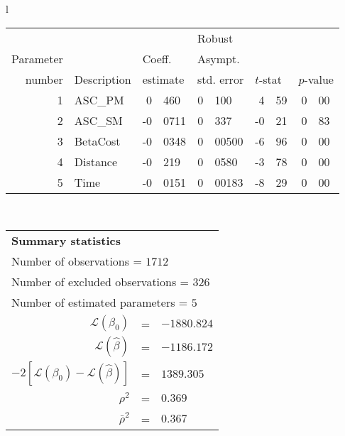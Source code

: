   \begin{tabular}{l}
\begin{tabular}{rlr@{.}lr@{.}lr@{.}lr@{.}l}
         &                       &   \multicolumn{2}{l}{}    & \multicolumn{2}{l}{Robust}  &     \multicolumn{4}{l}{}   \\
Parameter &                       &   \multicolumn{2}{l}{Coeff.}      & \multicolumn{2}{l}{Asympt.}  &     \multicolumn{4}{l}{}   \\
number &  Description                     &   \multicolumn{2}{l}{estimate}      & \multicolumn{2}{l}{std. error}  &   \multicolumn{2}{l}{$t$-stat}  &   \multicolumn{2}{l}{$p$-value}   \\

\hline

1 & ASC_PM  & 0&460 & 0&100 & 4&59 & 0&00\\
2 & ASC_SM & -0&0711 & 0&337 & -0&21 & 0&83\\
3 & BetaCost & -0&0348 & 0&00500 & -6&96 & 0&00\\
4 & Distance & -0&219 & 0&0580 & -3&78 & 0&00\\
5 & Time & -0&0151 & 0&00183 & -8&29 & 0&00\\
\hline
\end{tabular}
\\
\begin{tabular}{rcl}
\multicolumn{3}{l}{\bf Summary statistics}\\
\multicolumn{3}{l}{ Number of observations = $1712$} \\
\multicolumn{3}{l}{ Number of excluded observations = $326$} \\
\multicolumn{3}{l}{ Number of estimated  parameters = $5$} \\
 $\mathcal{L}(\beta_0)$ &=&  $-1880.824$ \\
 $\mathcal{L}(\hat{\beta})$ &=& $-1186.172 $  \\
 $-2[\mathcal{L}(\beta_0) -\mathcal{L}(\hat{\beta})]$ &=& $1389.305$ \\
    $\rho^2$ &=&   $0.369$ \\
    $\bar{\rho}^2$ &=&    $0.367$ \\
\end{tabular}
  \end{tabular}
